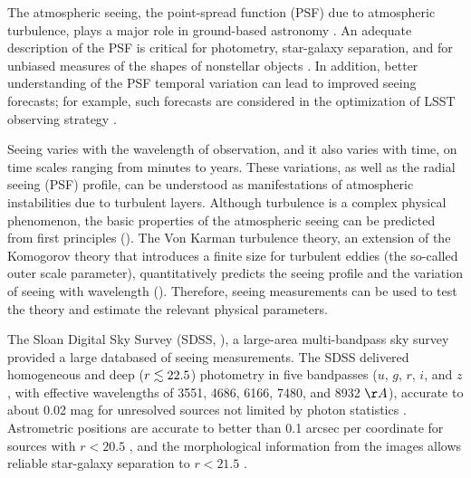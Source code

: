 

The atmospheric seeing, the point-spread function (PSF) due to atmospheric turbulence, plays
a major role in ground-based astronomy \cite{Roddier1981}. An adequate description 
of the PSF is critical for photometry, star-galaxy separation, and for unbiased measures of 
the shapes of nonstellar objects \citep{Lupton2001}. In addition, better understanding of the 
PSF temporal variation can lead to improved seeing forecasts; for example, such forecasts are 
considered in the optimization of LSST observing strategy \citep{LSSToverview}.

Seeing varies with the wavelength of observation, and it also varies with time, on time 
scales ranging from minutes to years. These variations, as well as the radial seeing (PSF) 
profile, can be understood as manifestations of atmospheric instabilities due to turbulent layers. 
Although turbulence is a complex physical phenomenon, the basic properties of the atmospheric
seeing can be predicted from first principles (\cite{Racine2009}). The Von Karman turbulence theory, 
an extension of the Komogorov theory that introduces a finite size for turbulent eddies (the so-called
outer scale parameter), quantitatively predicts the seeing profile and the variation of seeing
with wavelength (\cite{Tokovinin2002, MartinezMessenger}). Therefore, seeing measurements can be used to test the theory and estimate
the relevant physical parameters. 

The Sloan Digital Sky Survey (SDSS, \citealt{York2000}), a large-area multi-bandpass sky survey
provided a large databased of seeing measurements. The SDSS delivered homogeneous and deep 
($r\lesssim22.5$) photometry in five bandpasses ($u$, $g$, $r$, $i$, and $z$, with effective wavelengths 
of 3551, 4686, 6166, 7480, and 8932 $\AA$), accurate to about 0.02 mag for unresolved sources 
not limited by photon statistics \citep{Sesar2007}. Astrometric positions are accurate to better 
than 0.1 arcsec per coordinate for sources with $r<20.5$ \citep{Pier2003}, and the morphological 
information from the images allows reliable star-galaxy separation to $r<21.5$ \citep{Lupton2002}.
 
